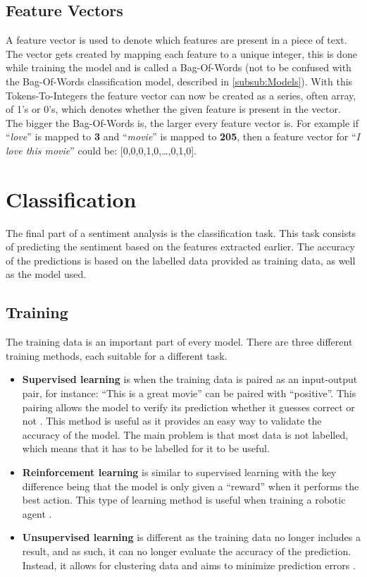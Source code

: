 \subsection{Feature Vectors}\label{sub:FeatureVector}
A feature vector is used to denote which features are present in a piece of
text. The vector gets created by mapping each feature to a unique integer, this
is done while training the model and is called a Bag-Of-Words (not to be
confused with the Bag-Of-Words classification model, described in
\autoref{subsub:Models}). With this Tokens-To-Integers the feature vector can
now be created as a series, often array, of 1's or 0's, which denotes whether
the given feature is present in the vector. The bigger the Bag-Of-Words is, the
larger every feature vector is. For example if ``\textit{love}'' is mapped to
\textbf{3} and ``\textit{movie}'' is mapped to \textbf{205}, then a feature
vector for ``\textit{I love this movie}'' could be: [0,0,0,1,0,\ldots,0,1,0].


\section{Classification}\label{sec:Class}
The final part of a sentiment analysis is the classification task. This task
consists of predicting the sentiment based on the features extracted earlier.
The accuracy of the predictions is based on the labelled data provided as
training data, as well as the model used.

\subsection{Training}\label{subsec:Train}
The training data is an important part of every model. There are three
different training methods, each suitable for a different task.

\begin{itemize}
  \item \textbf{Supervised learning} is when the training data is paired as an
  input-output pair, for instance: ``This is a great movie'' can be paired with
  ``positive''. This pairing allows the model to verify its prediction whether
  it guesses correct or not \citep[Ch. 7.0]{MIBook}. This method is useful as it
  provides an easy way to validate the accuracy of the model. The main problem
  is that most data is not labelled, which means that it has to be labelled for
  it to be useful.
  \item \textbf{Reinforcement learning} is similar to supervised learning with
  the key difference being that the model is only given a ``reward'' when it
  performs the best action. This type of learning method is useful when training
  a robotic agent \citep{Reinforcement}.
  \item \textbf{Unsupervised learning} is different as the training data no
  longer includes a result, and as such, it can no longer evaluate the accuracy
  of the prediction. Instead, it allows for clustering data and aims to minimize
  prediction errors \citep[Ch. 11.1]{MIBook}.
\end{itemize}

